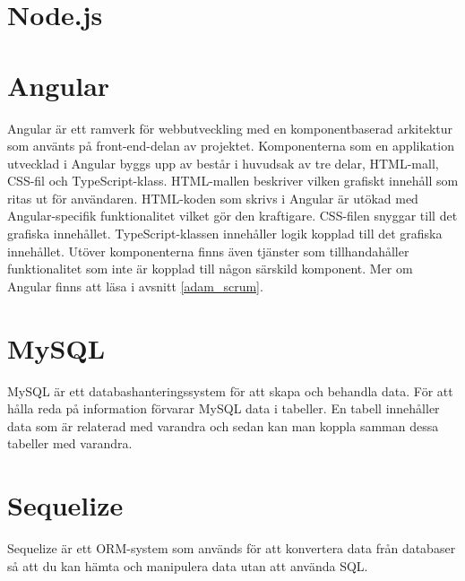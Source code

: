 \section{Node.js}

\section{Angular}
Angular är ett ramverk för webbutveckling med en komponentbaserad arkitektur som använts på front-end-delan av projektet. Komponenterna som en applikation utvecklad i Angular byggs upp av består i huvudsak av tre delar, HTML-mall, CSS-fil och TypeScript-klass. 
HTML-mallen beskriver vilken grafiskt innehåll som ritas ut för användaren. HTML-koden som skrivs i Angular är utökad med Angular-specifik funktionalitet vilket gör den kraftigare.  
CSS-filen snyggar till det grafiska innehållet.
TypeScript-klassen innehåller logik kopplad till det grafiska innehållet.
Utöver komponenterna finns även tjänster som tillhandahåller funktionalitet som inte är kopplad till någon särskild komponent. Mer om Angular finns att läsa i avsnitt \ref{adam_scrum}.
 
\section{MySQL}
MySQL är ett databashanteringssystem för att skapa och behandla data. För att hålla reda på information förvarar MySQL data i tabeller. En tabell innehåller data som är relaterad med varandra och sedan kan man koppla samman dessa tabeller med varandra.
\cite{mysql}

\section{Sequelize}
Sequelize är ett ORM-system som används för att konvertera data från databaser så att du kan hämta och manipulera data utan att använda SQL.
\cite{sequelize}
